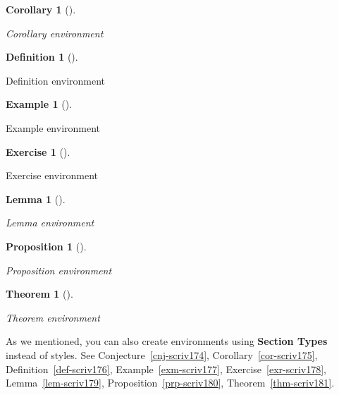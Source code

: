 \documentclass[
  12pt,
  a4paper,
  numbers=noenddot,
  titlepage,
  toclink=all,
  toc=bibliography]{scrbook}
\theoremstyle{plain}
\newtheorem{lemma}{Lemma}[section]
\theoremstyle{definition}
\newtheorem{exercise}{Exercise}[section]
\theoremstyle{definition}
\newtheorem{definition}{Definition}[section]
\theoremstyle{definition}
\newtheorem{example}{Example}[section]
\theoremstyle{plain}
\theoremstyle{plain}
\newtheorem{proposition}{Proposition}[section]
\theoremstyle{plain}
\newtheorem{theorem}{Theorem}[section]
\theoremstyle{plain}
\newtheorem{corollary}{Corollary}[section]
\theoremstyle{remark}
\begin{document}
\begin{corollary}[]\protect\hypertarget{cor-scriv173}{}\label{cor-scriv173}

Corollary environment

\end{corollary}

\begin{definition}[]\protect\hypertarget{def-scriv173}{}\label{def-scriv173}

Definition environment

\end{definition}

\begin{example}[]\protect\hypertarget{exm-scriv173}{}\label{exm-scriv173}

Example environment

\end{example}

\begin{exercise}[]\protect\hypertarget{exr-scriv173}{}\label{exr-scriv173}

Exercise environment

\end{exercise}

\begin{lemma}[]\protect\hypertarget{lem-scriv173}{}\label{lem-scriv173}

Lemma environment

\end{lemma}

\begin{proposition}[]\protect\hypertarget{prp-scriv173}{}\label{prp-scriv173}

Proposition environment

\end{proposition}

\begin{theorem}[]\protect\hypertarget{thm-scriv173}{}\label{thm-scriv173}

Theorem environment

\end{theorem}

As we mentioned, you can also create environments using \textbf{Section
Types} instead of styles. See
\protect\hypertarget{cite_45}{}{\label{cite_45}Conjecture~\ref{cnj-scriv174}},
\protect\hypertarget{cite_46}{}{\label{cite_46}Corollary~\ref{cor-scriv175}},
\protect\hypertarget{cite_47}{}{\label{cite_47}Definition~\ref{def-scriv176}},
\protect\hypertarget{cite_48}{}{\label{cite_48}Example~\ref{exm-scriv177}},
\protect\hypertarget{cite_49}{}{\label{cite_49}Exercise~\ref{exr-scriv178}},
\protect\hypertarget{cite_50}{}{\label{cite_50}Lemma~\ref{lem-scriv179}},
\protect\hypertarget{cite_51}{}{\label{cite_51}Proposition~\ref{prp-scriv180}},
\protect\hypertarget{cite_52}{}{\label{cite_52}Theorem~\ref{thm-scriv181}}.
\end{document}

